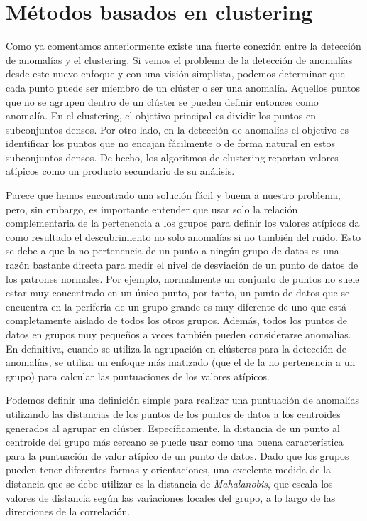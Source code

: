 \section{Métodos basados en clustering}
Como ya comentamos anteriormente existe una fuerte conexión entre la detección
de anomalías y el clustering. Si vemos el problema de la detección de anomalías
desde este nuevo enfoque y con una visión simplista, podemos determinar que cada
punto puede ser miembro de un clúster o ser una anomalía. Aquellos puntos que
no se agrupen dentro de un clúster se pueden definir entonces como anomalía.
En el clustering, el objetivo principal es dividir los puntos en subconjuntos
densos. Por otro lado, en la detección de anomalías el objetivo es identificar
los puntos que no encajan fácilmente o de forma natural en estos subconjuntos
densos. De hecho, los algoritmos de clustering reportan valores atípicos como 
un producto secundario de su análisis.

Parece que hemos encontrado una solución fácil y buena a nuestro problema,
pero, sin embargo, es importante entender que usar solo la relación
complementaria de la pertenencia a los grupos para definir los
valores atípicos da como resultado el descubrimiento no solo anomalías si no
también del ruido. Esto se debe a que la no pertenencia de un punto a ningún
grupo de datos es una razón bastante directa para medir el nivel de
desviación de un punto de datos de los patrones normales.  Por ejemplo, 
normalmente un conjunto de puntos no suele estar muy concentrado en un único
punto, por tanto, un punto de datos que se encuentra en la periferia
de un grupo grande es muy diferente de uno que está completamente 
aislado de todos los otros grupos. Además, todos los puntos de datos
en grupos muy pequeños a veces también pueden considerarse anomalías. 
En definitiva, cuando se utiliza la agrupación en clústeres para la 
detección de anomalías, se utiliza un enfoque más matizado (que el de 
la no pertenencia a un grupo) para calcular las puntuaciones de los 
valores atípicos.


Podemos definir una definición simple para realizar una puntuación de anomalías
utilizando las distancias de los puntos de los puntos de datos a los centroides
generados al agrupar en clúster. Específicamente, la distancia de un punto
al centroide del grupo más cercano se puede usar como una buena característica
para la puntuación de valor atípico de un punto de datos. Dado que los grupos
pueden tener diferentes formas y orientaciones, una excelente medida de la
distancia que se debe utilizar es la distancia de \textit{Mahalanobis}, que escala los
valores de distancia según las variaciones locales del grupo, a lo largo de las
direcciones de la correlación. 

